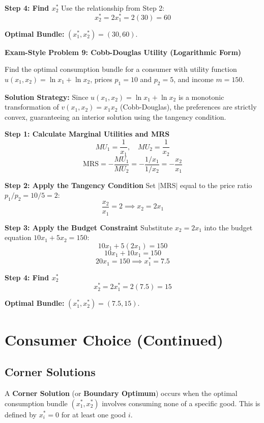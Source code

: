 \documentclass{article}
\begin{document}
\textbf{Step 4: Find $x_2^*$}
Use the relationship from Step 2:
\[ x_2^* = 2x_1^* = 2(30) = 60 \]

\textbf{Optimal Bundle:} $(x_1^*, x_2^*) = (30, 60)$.

\vspace{0.5em}
\hrulefill
\vspace{0.5em}

\noindent\textbf{Exam-Style Problem 9: Cobb-Douglas Utility (Logarithmic Form)}

Find the optimal consumption bundle for a consumer with utility function $u(x_1, x_2) = \ln x_1 + \ln x_2$, prices $p_1=10$ and $p_2=5$, and income $m=150$.

\textbf{Solution Strategy:} Since $u(x_1, x_2) = \ln x_1 + \ln x_2$ is a monotonic transformation of $v(x_1, x_2) = x_1 x_2$ (Cobb-Douglas), the preferences are strictly convex, guaranteeing an interior solution using the tangency condition.

\textbf{Step 1: Calculate Marginal Utilities and MRS}
\[ MU_1 = \frac{1}{x_1}, \quad MU_2 = \frac{1}{x_2} \]
\[ \text{MRS} = -\frac{MU_1}{MU_2} = -\frac{1/x_1}{1/x_2} = -\frac{x_2}{x_1} \]

\textbf{Step 2: Apply the Tangency Condition}
Set $|\text{MRS}|$ equal to the price ratio $p_1/p_2 = 10/5 = 2$:
\[ \frac{x_2}{x_1} = 2 \implies x_2 = 2x_1 \]

\textbf{Step 3: Apply the Budget Constraint}
Substitute $x_2 = 2x_1$ into the budget equation $10x_1 + 5x_2 = 150$:
\[ 10x_1 + 5(2x_1) = 150 \]
\[ 10x_1 + 10x_1 = 150 \]
\[ 20x_1 = 150 \implies x_1^* = 7.5 \]

\textbf{Step 4: Find $x_2^*$}
\[ x_2^* = 2x_1^* = 2(7.5) = 15 \]

\textbf{Optimal Bundle:} $(x_1^*, x_2^*) = (7.5, 15)$.

\hrulefill

\section{Consumer Choice (Continued)}

\subsection{Corner Solutions}

A \textbf{Corner Solution} (or \textbf{Boundary Optimum}) occurs when the optimal consumption bundle $(x_1^*, x_2^*)$ involves consuming none of a specific good. This is defined by $x_i^* = 0$ for at least one good $i$.
\end{document}
